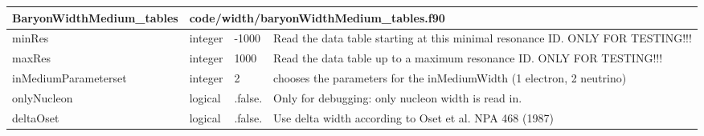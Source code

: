 \documentclass{article}
\begin{document}
\begin{longtable}{llll}
\toprule
\textbf{\large{BaryonWidthMedium\_tables}} & \multicolumn{3}{l}{\footnotesize{code/width/baryonWidthMedium\_tables.f90}}\\*
\midrule
\endfirsthead
\midrule
\endhead
minRes & \begin{minipage}[t]{2cm}integer\end{minipage} & \begin{minipage}[t]{2cm}-1000\end{minipage} & \begin{minipage}[t]{12cm}Read the data table starting at this minimal resonance ID. ONLY FOR TESTING!!!\end{minipage}\\*
\midrule
maxRes & \begin{minipage}[t]{2cm}integer\end{minipage} & \begin{minipage}[t]{2cm}1000\end{minipage} & \begin{minipage}[t]{12cm}Read the data table up to a maximum resonance ID. ONLY FOR TESTING!!!\end{minipage}\\*
\midrule
inMediumParameterset & \begin{minipage}[t]{2cm}integer\end{minipage} & \begin{minipage}[t]{2cm}2\end{minipage} & \begin{minipage}[t]{12cm}chooses the parameters for the inMediumWidth (1 electron, 2 neutrino)\end{minipage}\\*
\midrule
onlyNucleon & \begin{minipage}[t]{2cm}logical\end{minipage} & \begin{minipage}[t]{2cm}.false.\end{minipage} & \begin{minipage}[t]{12cm}Only for debugging: only nucleon width is read in.\end{minipage}\\*
\midrule
deltaOset & \begin{minipage}[t]{2cm}logical\end{minipage} & \begin{minipage}[t]{2cm}.false.\end{minipage} & \begin{minipage}[t]{12cm}Use delta width according to Oset et al. NPA 468 (1987)\end{minipage}\\*

\end{longtable}
\end{document}
